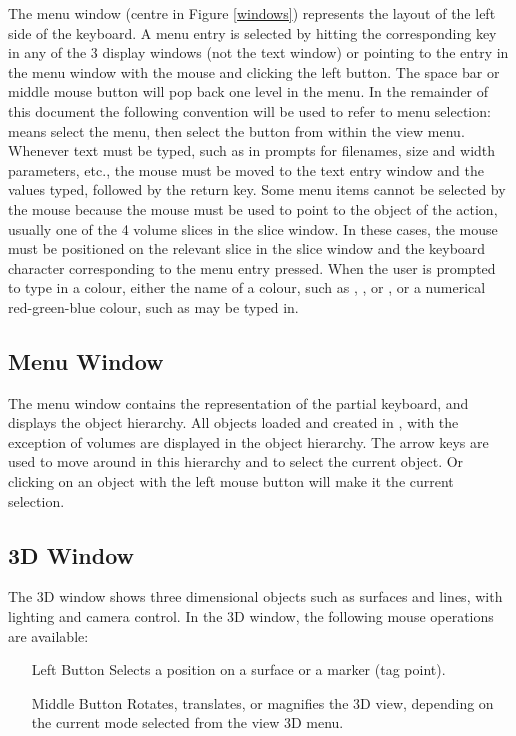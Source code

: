 The menu window (centre in Figure \ref{windows}) represents the layout
of the left side of the keyboard.  A menu entry is selected by hitting the
corresponding key in any of the 3 display windows (not the text window)
or pointing to the entry
in the menu window with the mouse and clicking the left button.
The space bar or middle mouse
button will pop back one level in the menu.  In the remainder of this document
the following convention will be used to refer to menu selection:
 means select the  menu, then
select the  button
from within the view menu.  Whenever text must be typed, such as in prompts
for filenames, size and width parameters, etc., the mouse must be moved to the
text entry window and the values typed, followed by the return key.
Some menu items cannot be selected by the mouse because the mouse must be
used to point to the object of the action, usually one of the 4 volume slices
in the slice window.
In these cases, the mouse must be positioned on the relevant slice in
the slice window and the
keyboard character corresponding to the menu entry pressed.
When the user is prompted to type in a colour, either the name of a colour,
such as , , or , or a numerical
red-green-blue colour,
such as \mbox{} may be typed in.

\subsection{Menu Window}

The menu window contains the representation of the partial keyboard, and
displays the object hierarchy.  All objects loaded and created in \display,
with the exception of volumes are displayed in the object hierarchy.  The
arrow keys are used to move around in this hierarchy and to select the
current object.  Or clicking on an object with the left mouse button
will make it the current selection.

\subsection{3D Window}

The 3D window shows three dimensional objects such as surfaces and
lines, with lighting and camera control.  In the 3D window, the following
mouse operations are available:

\begin{itemize}
\item[Left Button]  Selects a position on a surface or a marker (tag point).
\item[Middle Button]  Rotates, translates, or magnifies the 3D view, depending
                      on the current mode selected from the view 3D menu.
\end{itemize}

